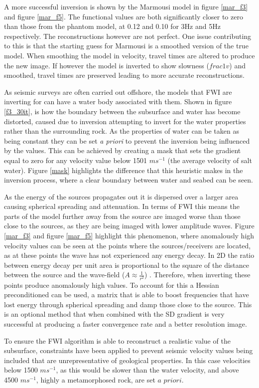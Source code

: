 A more successful inversion is shown by the Marmousi model in figure \ref{mar_f3} and figure \ref{mar_f5}. The functional values are both significantly closer to zero than those from the phantom model, at 0.12 and 0.10 for 3Hz and 5Hz respectively. The reconstructions however are not perfect. One issue contributing to this is that the starting guess for Marmousi is a smoothed version of the true model. When smoothing the model in velocity, travel times are altered to produce the new image. If however the model is inverted to show slowness ($frac{1}{v}$) and smoothed, travel times are preserved leading to more accurate reconstructions. \par 


As seismic surveys are often carried out offshore, the models that FWI are inverting for can have a water body associated with them. Shown in figure \ref{f3_30it}, is how the boundary between the subsurface and water has become distorted, caused due to inversion attempting to invert for the water properties rather than the surrounding rock. 
As the properties of water can be taken as being constant they can be set \textit{a priori} to prevent the inversion being influenced by the values. This can be achieved by creating a mask that sets the gradient equal to zero for any velocity value below 1501 $ms^{-1}$ (the average velocity of salt water). Figure \ref{mask} highlights the difference that this heuristic makes in the inversion process, where a clear boundary between water and seabed can be seen. \par 

As the energy of the sources propagates out it is dispersed over a larger area causing spherical spreading and attenuation. In terms of FWI this means the parts of the model further away from the source are imaged worse than those close to the sources, as they are being imaged with lower amplitude waves. Figure \ref{mar_f3} and figure \ref{mar_f5} highlight this phenomenon, where anomalously high velocity values can be seen at the points where the sources/receivers are located, as at these points the wave has not experienced any energy decay. In 2D the ratio between energy decay per unit area is proportional to the square of the distance between the source and the wave-field ($A \approx \frac{1}{r^{2}}$) \citep{guasch20123d}. Therefore, when inverting these points produce anomalously high values. To account for this a Hessian preconditioned can be used, a matrix that is able to boost frequencies that have lost energy through spherical spreading and damp those close to the source. This is an optional method that when combined with the SD gradient is very successful at producing a faster convergence rate and a better resolution image. \par
To ensure the FWI algorithm is able to reconstruct a realistic value of the subsurface, constraints have been applied to prevent seismic velocity values being included that are unrepresentative of geological properties. In this case velocities below 1500 $ms^{-1}$, as this would be slower than the water velocity, and above 4500 $ms^{-1}$, highly a metamorphosed rock, are set $\textit{a priori}$.


